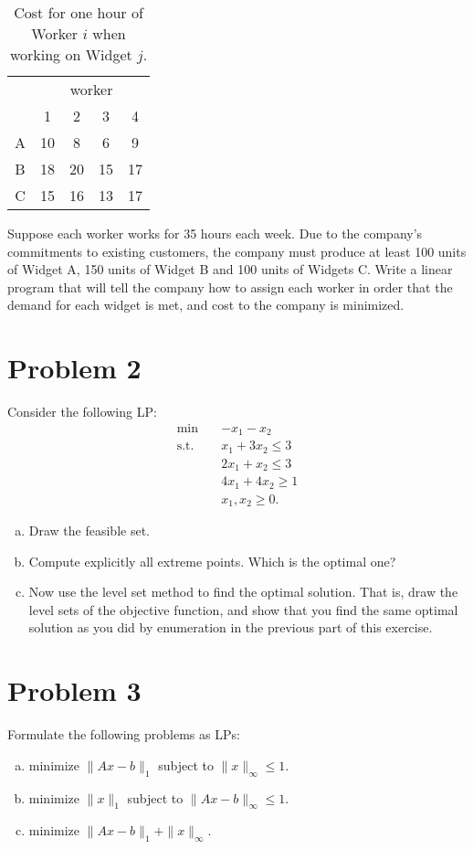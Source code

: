 \documentclass{article}
\begin{document}
\begin{table}[h]
\centering
\begin{tabular}{|c|cccc|}
\hline
\multicolumn{1}{|c|}{} & \multicolumn{4}{c|}{worker} \\
\multicolumn{1}{|c|}{} & 1 & 2 & 3 & 4 \\
\hline
A & 10 & 8 & 6 & 9 \\
B & 18 & 20 & 15 & 17 \\
C & 15 & 16 & 13 & 17 \\
\hline
\end{tabular}
\caption{Cost for one hour of Worker $i$ when working on Widget $j$.}
\end{table}

Suppose each worker works for 35 hours each week. Due to the company's commitments to existing customers, the company must produce at least 100 units of Widget A, 150 units of Widget B and 100 units of Widgets C. Write a linear program that will tell the company how to assign each worker in order that the demand for each widget is met, and cost to the company is minimized.

\section{Problem 2}
Consider the following LP:
\begin{align*}
\min \quad & -x_1 - x_2 \\
\text{s.t.} \quad & x_1 + 3x_2 \leq 3 \\
& 2x_1 + x_2 \leq 3 \\
& 4x_1 + 4x_2 \geq 1 \\
& x_1, x_2 \geq 0.
\end{align*}

\begin{enumerate}[(a)]
\item Draw the feasible set.
\item Compute explicitly all extreme points. Which is the optimal one?
\item Now use the level set method to find the optimal solution. That is, draw the level sets of the objective function, and show that you find the same optimal solution as you did by enumeration in the previous part of this exercise.
\end{enumerate}

\section{Problem 3}
Formulate the following problems as LPs:
\begin{enumerate}[(a)]
\item minimize $\|Ax - b\|_1$ subject to $\|x\|_\infty \leq 1$.
\item minimize $\|x\|_1$ subject to $\|Ax - b\|_\infty \leq 1$.
\item minimize $\|Ax - b\|_1 + \|x\|_\infty$.
\end{enumerate}
\end{document}
